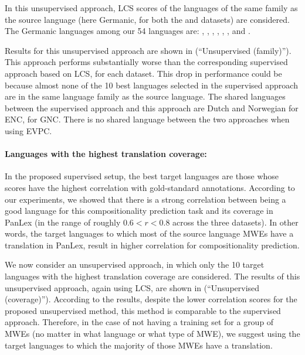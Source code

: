 \documentclass[output=paper,modfonts,nonflat]{langsci/langscibook}
\begin{document}
In this unsupervised approach, LCS scores of the languages of the same
family as the source language (here Germanic, for both the  and
 datasets) are considered. The Germanic languages among our 54
languages are: , , , , ,
,  and .

Results for this unsupervised approach are shown in
 (``Unsupervised (family)''). This
approach performs substantially worse than the corresponding
supervised approach based on LCS, for each dataset. This drop in
performance could be because almost none of the 10 best languages
selected in the supervised approach are in the same language family as
the source language. The shared languages between the supervised approach
and this approach are Dutch and Norwegian for ENC,  for GNC. 
There is no shared language between the two approaches when using EVPC.


\paragraph*{Languages with the highest translation coverage:}

In the proposed supervised setup, the best target languages are those
whose scores have the highest correlation with gold-standard
annotations.  According to our experiments, we showed that there is a
strong correlation between being a good language for this
compositionality prediction task and its coverage in PanLex (in the
range of roughly $0.6 < r < 0.8$ across the three datasets). In other words, the
target languages to which most of the source language MWEs have a
translation in PanLex, result in higher correlation for
compositionality prediction.

We now consider an unsupervised approach, in which only the 10
target languages with the highest translation coverage are
considered. The results of this unsupervised approach, again using
LCS, are shown in  (``Unsupervised
(coverage)''). According to the results, despite the lower correlation
scores for the proposed unsupervised method, this method is comparable
to the supervised approach.  Therefore, in the case of not having a
training set for a group of MWEs (no matter in what language or what
type of MWE), we suggest using the target languages to which the
majority of those MWEs have a translation.
\end{document}
